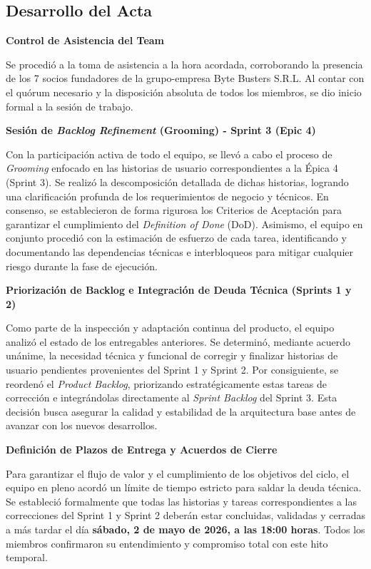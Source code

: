 \newpage
\subsection{Desarrollo del Acta}

\noindent \textbf{Control de Asistencia del Team}\par
Se procedió a la toma de asistencia a la hora acordada, corroborando la presencia de los 7 socios fundadores de la grupo-empresa Byte Busters S.R.L. Al contar con el quórum necesario y la disposición absoluta de todos los miembros, se dio inicio formal a la sesión de trabajo.

\vspace*{0.5cm}
\noindent \textbf{Sesión de \textit{Backlog Refinement} (Grooming) - Sprint 3 (Epic 4)}\par
Con la participación activa de todo el equipo, se llevó a cabo el proceso de \textit{Grooming} enfocado en las historias de usuario correspondientes a la Épica 4 (Sprint 3). Se realizó la descomposición detallada de dichas historias, logrando una clarificación profunda de los requerimientos de negocio y técnicos. En consenso, se establecieron de forma rigurosa los Criterios de Aceptación para garantizar el cumplimiento del \textit{Definition of Done} (DoD). Asimismo, el equipo en conjunto procedió con la estimación de esfuerzo de cada tarea, identificando y documentando las dependencias técnicas e interbloqueos para mitigar cualquier riesgo durante la fase de ejecución.

\vspace*{0.5cm}
\noindent \textbf{Priorización de Backlog e Integración de Deuda Técnica (Sprints 1 y 2)}\par
Como parte de la inspección y adaptación continua del producto, el equipo analizó el estado de los entregables anteriores. Se determinó, mediante acuerdo unánime, la necesidad técnica y funcional de corregir y finalizar historias de usuario pendientes provenientes del Sprint 1 y Sprint 2. Por consiguiente, se reordenó el \textit{Product Backlog}, priorizando estratégicamente estas tareas de corrección e integrándolas directamente al \textit{Sprint Backlog} del Sprint 3. Esta decisión busca asegurar la calidad y estabilidad de la arquitectura base antes de avanzar con los nuevos desarrollos.

\vspace*{0.5cm}
\noindent \textbf{Definición de Plazos de Entrega y Acuerdos de Cierre}\par
Para garantizar el flujo de valor y el cumplimiento de los objetivos del ciclo, el equipo en pleno acordó un límite de tiempo estricto para saldar la deuda técnica. Se estableció formalmente que todas las historias y tareas correspondientes a las correcciones del Sprint 1 y Sprint 2 deberán estar concluidas, validadas y cerradas a más tardar el día \textbf{sábado, 2 de mayo de 2026, a las 18:00 horas}. Todos los miembros confirmaron su entendimiento y compromiso total con este hito temporal.

